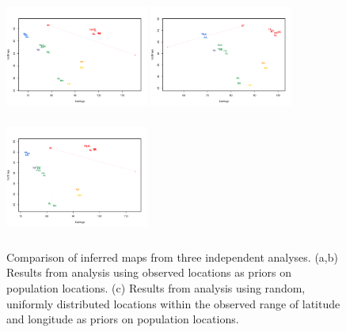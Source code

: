 \documentclass[12pt]{article}
\begin{document}
\begin{figure}
	\centering
		\subcaptionbox{\label{warb_pop_realpr1}}
			{\includegraphics[width=1.85in,height=1.54in]{figs/warblers/population_warbler_map_realpr1.png}}
		\subcaptionbox{\label{warb_pop_realpr2}}			
			{\includegraphics[width=1.85in,height=1.54in]{figs/warblers/population_warbler_map_realpr2.png}}
		\subcaptionbox{\label{warb_pop_randpr1}}
			{\includegraphics[width=1.85in,height=1.54in]{figs/warblers/population_warbler_map_randpr1.png}}
	\caption{Comparison of inferred maps from three independent analyses.  (a,b) Results from analysis using observed locations as priors on population locations.  (c) Results from analysis using random, uniformly distributed locations within the observed range of latitude and longitude as priors on population locations.}\label{sfig:warbler_pop_compare}
\end{figure}
\end{document}
